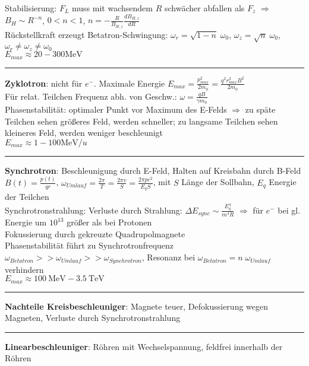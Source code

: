 \documentclass[10pt,twoside,a4paper]{article}
\begin{document}
\begin{multicols*}{3}
Stabilisierung: $F_L$ muss mit wachsendem $R$ schwächer abfallen als $F_z$ $\Rightarrow$ $B_H \sim R^{-n}$, $0 < n < 1$, $n = - \frac{R}{B_{H,z}} \frac{dB_{H,z}}{dR}$ \\
Rückstellkraft erzeugt Betatron-Schwingung: $\omega_r = \sqrt{1-n} \; \omega_0$, $\omega_z = \sqrt{n} \; \omega_0$, $\omega_r \neq \omega_z \neq \omega_0$ \\
$E_{max} \approx 20 - 300 \si{\mega\eV}$
\\ \rule[0ex]{\columnwidth}{0.5pt}
\textbf{Zyklotron}: nicht für $e^-$. Maximale Energie $E_{max} = \frac{p^2_{max}}{2 m_0} = \frac{q^2 r^2_{max} B^2}{2 m_0}$ \\
Für relat. Teilchen Frequenz abh. von Geschw.: $\omega = \frac{q B}{\gamma m_0}$ \\
Phasenstabilität: optimaler Punkt vor Maximum des E-Felds $\Rightarrow$ zu späte Teilchen sehen größeres Feld, werden schneller; zu langsame Teilchen sehen kleineres Feld, werden weniger beschleunigt \\
$E_{max} \approx 1 - 100 \si{\mega\eV}/u$
\\ \rule[0ex]{\columnwidth}{0.5pt}
\textbf{Synchrotron}: Beschleunigung durch E-Feld, Halten auf Kreisbahn durch B-Feld \\
$B(t) = \frac{p(t)}{q r}$, $\omega_{Umlauf} = \frac{2 \pi}{T} = \frac{2 \pi v}{S} = \frac{2 \pi p c^2}{E_q S}$, mit $S$ Länge der Sollbahn, $E_q$ Energie der Teilchen \\
Synchrotronstrahlung: Verluste durch Strahlung: $\Delta E_{sync} \sim \frac{E^4_q}{m^4 R}$ $\Rightarrow$ für $e^-$ bei gl. Energie um $10^{13}$ größer als bei Protonen \\
Fokussierung durch gekreuzte Quadrupolmagnete \\
Phasenstabilität führt zu Synchrotronfrequenz \\
$\omega_{Betatron} >> \omega_{Umlauf} >> \omega_{Synchrotron}$, Resonanz bei $\omega_{Betatron} = n \; \omega_{Umlauf}$ verhindern \\
$E_{max} \approx \SI{100}{\mega\eV} - \SI{3.5}{\tera\eV}$
\\ \rule[0ex]{\columnwidth}{0.5pt}
\textbf{Nachteile Kreisbeschleuniger}: Magnete teuer, Defokussierung wegen Magneten, Verluste durch Synchrotronstrahlung
\\ \rule[0ex]{\columnwidth}{0.5pt}
\textbf{Linearbeschleuniger}: Röhren mit Wechselspannung, feldfrei innerhalb der Röhren \\

\end{multicols*}
\end{document}

